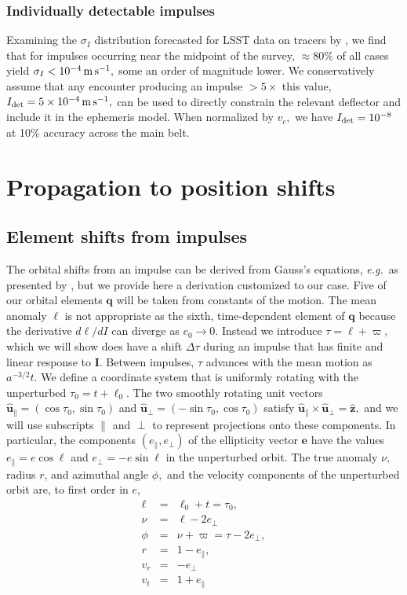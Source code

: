 \documentclass[linenumbers, onecolumn]{aastex631}
\newcommand{\eg}{\textit{e.g.\/}}
\newcommand{\vecI}{\mathbf{I}}
\newcommand{\vece}{\mathbf{e}}
\newcommand{\uhat}{\boldsymbol{\hat u}}
\newcommand{\zhat}{\mathbf{\hat z}}
\newcommand{\vecq}{\mathbf{q}}
\newcommand{\lop}{\varpi}   %
\newcommand{\ma}{\ell}  %
\begin{document}
\subsubsection{Individually detectable impulses}
Examining the $\sigma_I$ distribution forecasted for LSST data on
tracers by \citet{negin}, we find that for impulses occurring near the midpoint of the survey, $\approx80\%$ of all cases yield $\sigma_I<10^{-4}\,{\rm m}\,{\rm
  s}^{-1},$ some an order of magnitude lower.  We conservatively
assume that any encounter producing  an impulse $>5\times$ this value, $I_{\rm det}=5\times 10^{-4}\,{\rm m}\,{\rm
  s}^{-1},$ can be used to directly constrain the relevant deflector and include it in the ephemeris model.
When normalized by $v_c,$ we have $I_{\rm  det}=10^{-8}$ at 10\% accuracy across the main belt.

\section{Propagation to position shifts}
\label{sec:propagation}

\subsection{Element shifts from impulses}
\label{sec:elements}
The orbital shifts from an impulse can be derived from Gauss's
equations, \eg\ as presented by \citet[][Section 1.9.2]{tremaine}, but
we provide here a derivation customized to our case.
Five of our orbital elements $\vecq$ will be taken from constants of the motion.  The mean anomaly $\ma$ is not appropriate as the sixth, time-dependent element of $\vecq$ because the derivative $d\ma/dI$ can diverge as $e_0\rightarrow 0.$ Instead we introduce $\tau = \ma+\lop,$ which we will show does have a shift $\Delta\tau$ during an impulse that has finite and linear response to $\vecI$.  Between impulses, $\tau$ advances with the mean motion as $a^{-3/2}t.$  We define a coordinate system that is uniformly rotating with the unperturbed $\tau_0=t+\ma_0.$ The two smoothly rotating unit vectors $\uhat_\parallel=(\cos \tau_0, \sin \tau_0)$ and
$\uhat_\perp=(-\sin \tau_0, \cos \tau_0)$ satisfy $\uhat_\parallel
\times \uhat_\perp = \zhat,$ and we will use subscripts $\parallel$
and $\perp$ to represent projections onto these components.  In
particular, the components $(e_\parallel,e_\perp)$ of the ellipticity
vector $\vece$ have the values $e_\parallel=e\cos \ma$ and $e_\perp=-e\sin \ma$ in the unperturbed orbit.
The true anomaly $\nu,$ radius $r$, and azimuthal angle $\phi,$ and
the velocity components of the unperturbed orbit are, to first order in $e$,
\begin{eqnarray}
  \ma & = & \ma_0 + t = \tau_0,  \nonumber \\
  \nu & = & \ma - 2 e_\perp \nonumber \\
  \phi & = & \nu + \lop = \tau - 2e_\perp, \nonumber\\
  r & = & 1-e_\parallel, \nonumber \\
  v_r & = & -e_\perp \nonumber \\
  v_t & = & 1 + e_\parallel
            \label{eq:kepler}
\end{eqnarray}
\end{document}
